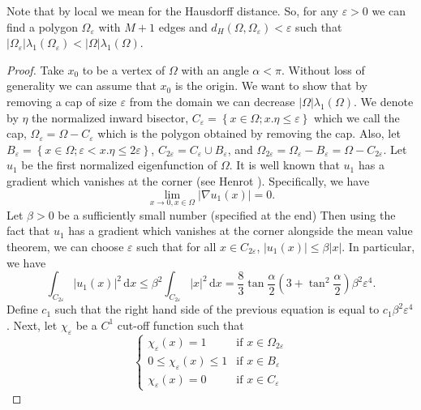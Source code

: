 \documentclass[12pt]{report}
\numberwithin{definition}{section}
\begin{document}
Note that by local we mean for the Hausdorff distance.
So, for any $\varepsilon > 0$ we can find a polygon $\Omega_{\varepsilon}$ with $M+1$ edges and $d_{H}(\Omega,\Omega_{\varepsilon}) < \varepsilon$ such that $| \Omega_{\varepsilon} |\lambda_{1}(\Omega_{\varepsilon}) <  | \Omega |\lambda_{1}(\Omega)$.

\begin{proof}
  Take $x_{0}$ to be a vertex of $\Omega$ with an angle $\alpha < \pi$.
  Without loss of generality we can assume that $x_{0}$ is the origin.
  We want to show that by removing a cap of size $\varepsilon$ from the domain we can decrease $| \Omega |\lambda_{1}(\Omega)$.
  We denote by $\eta$ the normalized inward bisector, $C_{\varepsilon} = \left\{ x \in \Omega;x.\eta \leq \varepsilon \right\}$ which we call the cap, $\Omega_{\varepsilon} = \Omega - C_{\varepsilon}$ which is the polygon obtained by removing the cap.
  Also, let $B_{\varepsilon} = \left\{ x \in \Omega; \varepsilon < x.\eta \leq 2 \varepsilon \right\}$, $C_{2 \varepsilon} = C_{\varepsilon} \cup B_{\varepsilon}$, and $\Omega_{2 \varepsilon} =  \Omega_{\varepsilon} - B_{\varepsilon} = \Omega - C_{2 \varepsilon}$.
  Let $u_1$ be the first normalized eigenfunction of $\Omega$.
  It is well known that $u_1$ has a gradient which vanishes at the corner (see Henrot \cite{henrot}).
  Specifically, we have
  \[
  \lim_{x \to 0, x \in \Omega} | \nabla u_1(x) | = 0
  .\] 
  Let $\beta > 0$ be a sufficiently small number (specified at the end)
  Then using the fact that $u_1$ has a gradient which vanishes at the corner alongside the mean value theorem, we can choose $\varepsilon$ such that for all $x \in C_{2 \varepsilon}$, $| u_1(x) | \leq \beta | x |$. 
  In particular, we have
  \[
    \int_{ C_{2 \varepsilon}} \! | u_1(x) |^{2} \, \mathrm{d}x \leq \beta^{2} \int_{ C_{2 \varepsilon}} \! | x |^{2} \, \mathrm{d}x = \frac{8}{3} \tan \frac{\alpha}{2} \left( 3 + \tan^{2} \frac{\alpha}{2} \right ) \beta^{2} \varepsilon^{4}
  .\] 
  Define $c_{1}$ such that the right hand side of the previous equation is equal to $c_{1}\beta^{2}\varepsilon^{4}$.
  Next, let $\chi_{\varepsilon}$ be a $C^{1}$ cut-off function such that 
  \[ 
    \begin{cases}
      \chi_{\varepsilon}(x) = 1 & \text{if } x \in \Omega_{2 \varepsilon} \\
      0 \leq \chi_{\varepsilon}(x) \leq  1 & \text{if } x \in B_{\varepsilon} \\
      \chi_{\varepsilon}(x) = 0 & \text{if } x \in C_{\varepsilon}
    \end{cases}
\]
\end{proof}
\end{document}
